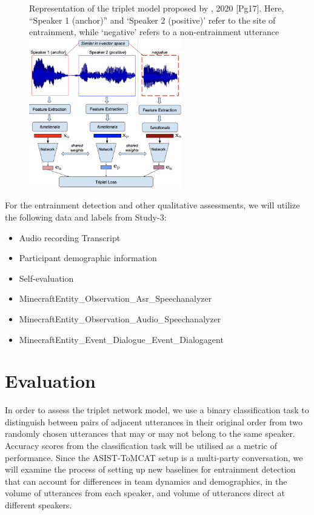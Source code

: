     \begin{figure}
    \begin{sidecaption}{Representation of the triplet model proposed by \citeauthor{nasir2020}, 2020 [Pg17]. Here, ``Speaker 1 (anchor)'' and `Speaker 2 (positive)' refer to the site of entrainment, while `negative' refers to a non-entrainment utterance}
    \centering
    \includegraphics[width=0.6\textwidth]{images/triplet-model.png}
    \label{fig:sentiment_model_schematics}
    \end{sidecaption}
    \end{figure}

    For the entrainment detection and other qualitative assessments, we will utilize the following data and labels from Study-3:
            \begin{itemize}               
                   \item Audio recording
                    Transcript
                   \item Participant demographic information
                   \item Self-evaluation
                   \item MinecraftEntity\_Observation\_Asr\_Speechanalyzer
                   \item MinecraftEntity\_Observation\_Audio\_Speechanalyzer
                   \item MinecraftEntity\_Event\_Dialogue\_Event\_Dialogagent
            \end{itemize}

\section{Evaluation}

    In order to assess the triplet network model, we use a binary classification task to distinguish between pairs of adjacent utterances in their original order from two randomly chosen utterances that may or may not belong to the same speaker. Accuracy scores from the classification task will be utilised as a metric of performance. Since the ASIST-ToMCAT setup is a multi-party conversation, we will examine the process of setting up new baselines for entrainment detection that can account for differences in team dynamics and demographics, in the volume of utterances from each speaker, and volume of utterances direct at different speakers.

